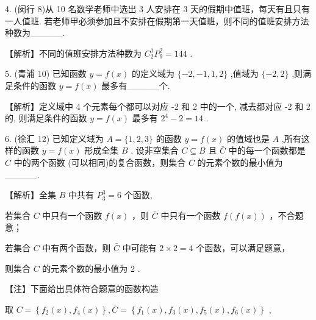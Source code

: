 \documentclass[10pt]{article}
\begin{document}
4. (闵行 8)从 10 名数学老师中选出 3 人安排在 3 天的假期中值班，每天有且只有一人值班. 若老师甲必须参加且不安排在假期第一天值班，则不同的值班安排方法种数为\_\_\_\_\_.

【解析】不同的值班安排方法种数为 \({C}_{2}^{1}{P}_{9}^{2} = {144}\) .

5. (青浦 10) 已知函数 \(y = f\left( x\right)\) 的定义域为 \(\{  - 2, - 1,1,2\}\) ,值域为 \(\{  - 2,2\}\) ,则满足条件的函数 \(y = f\left( x\right)\) 最多有\_\_\_\_\_个.

【解析】定义域中 4 个元素每个都可以对应 -2 和 2 中的一个, 减去都对应 -2 和 2 的, 则满足条件的函数 \(y = f\left( x\right)\) 最多有 \({2}^{4} - 2 = {14}\) .

6. (徐汇 12) 已知定义域为 \(A = \{ 1,2,3\}\) 的函数 \(y = f\left( x\right)\) 的值域也是 \(A\) ,所有这样的函数 \(y = f\left( x\right)\) 形成全集 \(B\) . 设非空集合 \(C \subseteq  B\) 且 \(\bar{C}\) 中的每一个函数都是 \(C\) 中的两个函数 (可以相同)的复合函数，则集合 \(C\) 的元素个数的最小值为\_\_\_\_\_.

【解析】全集 \(B\) 中共有 \({P}_{3}^{3} = 6\) 个函数,

若集合 \(C\) 中只有一个函数 \(f\left( x\right)\) ，则 \(\bar{C}\) 中只有一个函数 \(f\left( {f\left( x\right) }\right)\) ，不合题意；

若集合 \(C\) 中有两个函数，则 \(\bar{C}\) 中可能有 \(2 \times  2 = 4\) 个函数，可以满足题意，

则集合 \(C\) 的元素个数的最小值为 2 .

【注】下面给出具体符合题意的函数构造

\begin{center}
\end{center}

取 \(C = \left\{  {{f}_{2}\left( x\right) ,{f}_{4}\left( x\right) }\right\}  ,\bar{C} = \left\{  {{f}_{1}\left( x\right) ,{f}_{3}\left( x\right) ,{f}_{5}\left( x\right) ,{f}_{6}\left( x\right) }\right\}\) ,
\end{document}
